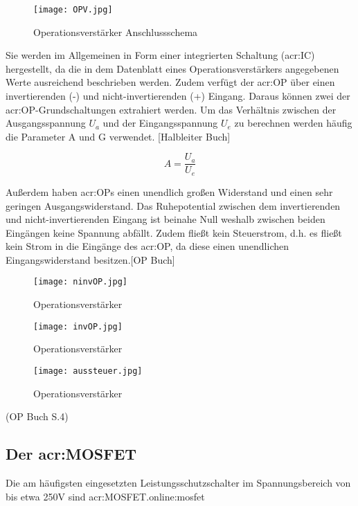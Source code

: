 \begin{figure}[H]
	\centering
	\texttt{[image: OPV.jpg]}
	\caption[Operationsverstärker Anschlussschema]{Operationsverstärker Anschlussschema} 
	\cite{Eigen}
	\label{fig:OPV}
\end{figure}

Sie werden im Allgemeinen in Form einer integrierten Schaltung (\gls{acr:IC}) hergestellt, da die in dem Datenblatt eines Operationsverstärkers angegebenen Werte ausreichend beschrieben werden. Zudem verfügt der \gls{acr:OP} über einen invertierenden (-) und nicht-invertierenden (+) Eingang. Daraus können zwei der \gls{acr:OP}-Grundschaltungen extrahiert werden. Um das Verhältnis zwischen der Ausgangsspannung $U_{a}$ und der Eingangsspannung $U_{e}$ zu berechnen werden häufig die Parameter A und G verwendet. [Halbleiter Buch]

\begin{equation}
	\label{equ:bsp1}
	A = \frac{U_{a}}{U_{e}}
\end{equation}

Außerdem haben \gls{acr:OP}s einen unendlich großen Widerstand und einen sehr geringen Ausgangswiderstand.
Das Ruhepotential zwischen dem invertierenden und nicht-invertierenden Eingang ist beinahe Null weshalb zwischen beiden Eingängen keine Spannung abfällt. Zudem fließt kein Steuerstrom, d.h. es fließt kein Strom in die Eingänge des \gls{acr:OP}, da diese einen unendlichen Eingangswiderstand besitzen.[OP Buch]


\begin{figure}[H]
	\centering
	\texttt{[image: ninvOP.jpg]}
	\caption[Operationsverstärker]{Operationsverstärker} 
	\cite{Eigen}
	\label{fig:ninvOP}
\end{figure}

\begin{figure}[H]
	\centering
	\texttt{[image: invOP.jpg]}
	\caption[Operationsverstärker]{Operationsverstärker} 
	\cite{Eigen}
	\label{fig:invOP}
\end{figure}

\begin{figure}[H]
	\centering
	\texttt{[image: aussteuer.jpg]}
	\caption[Operationsverstärker]{Operationsverstärker} 
	\cite{Eigen}
	\label{fig:aussteuer}
\end{figure} (OP Buch S.4)


\newpage
\subsection{Der \gls{acr:MOSFET}}
\label{subsec:Unterabschnitt12}
Die am häufigsten eingesetzten Leistungsschutzschalter im Spannungsbereich von bis etwa 250V sind \gls{acr:MOSFET}.\gls{online:mosfet}


